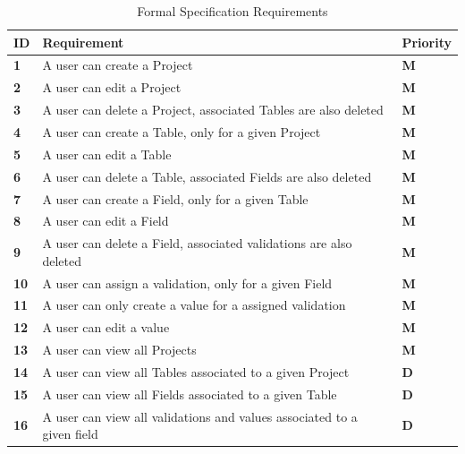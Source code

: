 \documentclass[a4paper,12pt]{article}
\begin{document}
\begin{table}
\centering
\caption{Formal Specification Requirements}
\label{my-label}
\begin{tabular}{|l|l|l|}
\hline
\textbf{ID} & \textbf{Requirement}                                                   & \textbf{Priority} \\ \hline
\textbf{1}  & A user can create a Project                                            & \textbf{M}        \\ \hline
\textbf{2}  & A user can edit a Project                                              & \textbf{M}        \\ \hline
\textbf{3}  & A user can delete a Project, associated Tables are also deleted        & \textbf{M}        \\ \hline
\textbf{4}  & A user can create a Table, only for a given  Project                   & \textbf{M}        \\ \hline
\textbf{5}  & A user can edit a Table                                                & \textbf{M}        \\ \hline
\textbf{6}  & A user can delete a Table, associated Fields are also deleted          & \textbf{M}        \\ \hline
\textbf{7}  & A user can create a Field, only for a given Table                      & \textbf{M}        \\ \hline
\textbf{8}  & A user can edit a Field                                                & \textbf{M}        \\ \hline
\textbf{9}  & A user can delete a Field, associated validations are also deleted     & \textbf{M}        \\ \hline
\textbf{10} & A user can assign a validation, only for a given Field       & \textbf{M}        \\ \hline
\textbf{11} & A user can only create a value for a assigned validation                  & \textbf{M}        \\ \hline
\textbf{12} & A user can edit a  value                      & \textbf{M}        \\ \hline
\textbf{13} & A user can view all Projects                 & \textbf{M}        \\ \hline
\textbf{14} & A user can view all Tables associated to a given Project               & \textbf{D}        \\ \hline
\textbf{15} & A user can view all Fields associated to a given Table                 & \textbf{D}        \\ \hline
\textbf{16} & A user can view all validations and values associated to a given field & \textbf{D}        \\ \hline
\end{tabular}
\end{table}
\end{document}

